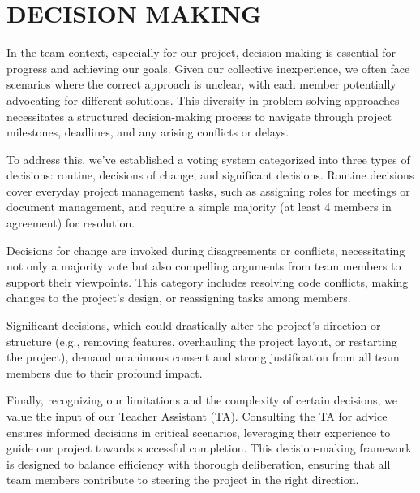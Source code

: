 \section{DECISION MAKING}
In the team context, especially for our project, decision-making is essential for progress and achieving our goals. Given our collective inexperience, we often face scenarios where the correct approach is unclear, with each member potentially advocating for different solutions. This diversity in problem-solving approaches necessitates a structured decision-making process to navigate through project milestones, deadlines, and any arising conflicts or delays. \par
\smallskip
To address this, we've established a voting system categorized into three types of decisions: routine, decisions of change, and significant decisions. Routine decisions cover everyday project management tasks, such as assigning roles for meetings or document management, and require a simple majority (at least 4 members in agreement) for resolution.\par
\smallskip
Decisions for change are invoked during disagreements or conflicts, necessitating not only a majority vote but also compelling arguments from team members to support their viewpoints. This category includes resolving code conflicts, making changes to the project's design, or reassigning tasks among members. \par
\smallskip
Significant decisions, which could drastically alter the project's direction or structure (e.g., removing features, overhauling the project layout, or restarting the project), demand unanimous consent and strong justification from all team members due to their profound impact.\par
\smallskip
Finally, recognizing our limitations and the complexity of certain decisions, we value the input of our Teacher Assistant (TA). Consulting the TA for advice ensures informed decisions in critical scenarios, leveraging their experience to guide our project towards successful completion. This decision-making framework is designed to balance efficiency with thorough deliberation, ensuring that all team members contribute to steering the project in the right direction.\par
\smallskip